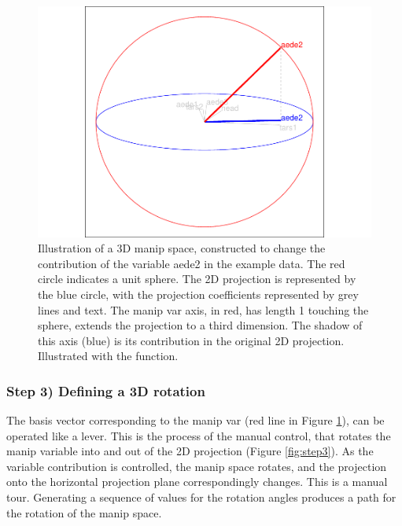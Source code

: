 \begin{Schunk}
\begin{figure}

{\centering \includegraphics[width=0.7\linewidth]{spinifex_paper_files/figure-latex/step2-1} 

}

\caption[Illustration of a 3D manip space, constructed to change the contribution of the variable aede2 in the example data]{Illustration of a 3D manip space, constructed to change the contribution of the variable aede2 in the example data. The red circle indicates a unit sphere. The 2D projection is represented by the blue circle, with the projection coefficients represented by grey lines and text. The manip var axis, in red, has length 1 touching the sphere, extends the projection to a third dimension. The shadow of this axis (blue) is its contribution in the original 2D projection. Illustrated with the  function.}\label{fig:step2}
\end{figure}
\end{Schunk}

\hypertarget{step-3-defining-a-3d-rotation}{%
\subsubsection{Step 3) Defining a 3D
rotation}\label{step-3-defining-a-3d-rotation}}

The basis vector corresponding to the manip var (red line in Figure
\ref{fig:step2}), can be operated like a lever. This is the process of
the manual control, that rotates the manip variable into and out of the
2D projection (Figure \ref{fig:step3}). As the variable contribution is
controlled, the manip space rotates, and the projection onto the
horizontal projection plane correspondingly changes. This is a manual
tour. Generating a sequence of values for the rotation angles produces a
path for the rotation of the manip space.

